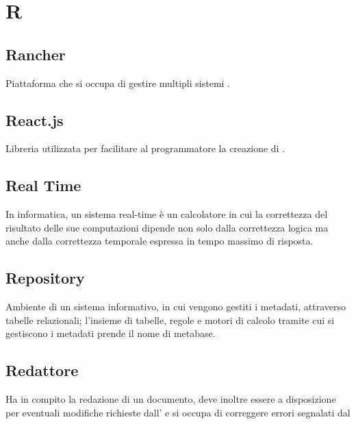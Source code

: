 \section*{R}
\markright{}

\subsection*{Rancher}
Piattaforma che si occupa di gestire multipli sistemi .

\subsection*{React.js}
Libreria  utilizzata per facilitare al programmatore la creazione di .

\subsection*{Real Time}
In informatica, un sistema real-time è un calcolatore in cui la correttezza del risultato delle sue computazioni dipende non solo dalla correttezza logica ma anche dalla correttezza temporale espressa in tempo massimo di risposta.

\subsection*{Repository}
Ambiente di un sistema informativo, in cui vengono gestiti i metadati, attraverso tabelle relazionali; l'insieme di tabelle, regole e motori di calcolo tramite cui si gestiscono i metadati prende il nome di metabase.  

\subsection*{Redattore}
Ha in compito la redazione di un documento, deve inoltre essere a disposizione per eventuali modifiche richieste dall' e si occupa di correggere errori segnalati dal 
